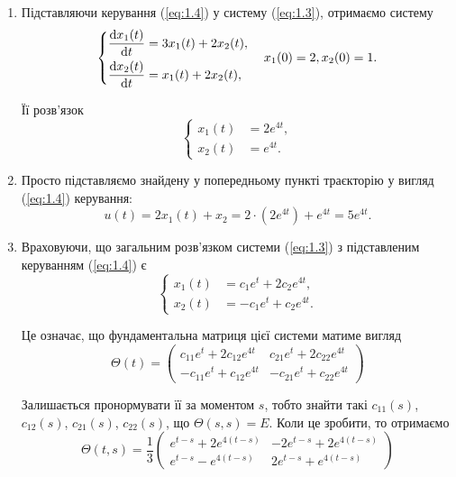 \begin{solution}
	\begin{enumerate}
		\item Підставляючи керування (\ref{eq:1.4}) у систему (\ref{eq:1.3}), отримаємо систему \[
		\left\{
			\begin{aligned}
				\frac{\mathop{}\!\mathrm{d} x_1 (t)}{\mathop{}\!\mathrm{d} t} &= 3 x_1 (t) + 2 x_2 (t), \\
				\frac{\mathop{}\!\mathrm{d} x_2 (t)}{\mathop{}\!\mathrm{d} t} &= x_1 (t) + 2 x_2 (t),
			\end{aligned}
		\right.
		\quad
		x_1 (0) = 2, x_2 (0) = 1.
		\]

		Її розв'язок \[
		\left\{
			\begin{aligned}
				x_1 (t) &= 2 e^{4 t}, \\
				x_2 (t) &= e^{4 t}.
			\end{aligned}
		\right.
		\]

		\item Просто підставляємо знайдену у попередньому пункті траєкторію у вигляд (\ref{eq:1.4}) керування: \[ u(t) = 2 x_1 (t) + x_2 = 2 \cdot \left( 2 e^{4 t} \right) + e^{4 t} = 5 e^{4 t}. \]

		\item Враховуючи, що загальним розв'язком системи (\ref{eq:1.3}) з підставленим керуванням (\ref{eq:1.4}) є \[
		\left\{
			\begin{aligned}
				x_1 (t) &= c_1 e^t + 2 c_2 e^{4 t}, \\
				x_2 (t) &= - c_1 e^t + c_2 e^{4 t}.
			\end{aligned}
		\right.
		\]

		Це означає, що фундаментальна матриця цієї системи матиме вигляд \[
			\Theta(t) = 
			\begin{pmatrix}
				c_{11} e^t + 2 c_{12} e^{4 t} & c_{21} e^t + 2 c_{22} e^{4 t} \\
				- c_{11} e^t + c_{12} e^{4 t} & - c_{21} e^t + c_{22} e^{4 t}
			\end{pmatrix}
		\]

		Залишається пронормувати її за моментом $s$, тобто знайти такі $c_{11} (s)$, $c_{12} (s)$, $c_{21} (s)$, $c_{22} (s)$, що $\Theta(s, s) = E$. Коли це зробити, то отримаємо \[
			\Theta(t, s) = \frac{1}{3}
			\begin{pmatrix}
				e^{t - s} + 2 e^{4 (t - s)} & -2 e^{t - s} + 2 e^{4 (t - s)} \\
				e^{t - s} - e^{4 (t - s)} & 2 e^{t - s} + e^{4 (t - s)}
			\end{pmatrix}
		\]


\end{enumerate}
\end{solution}
